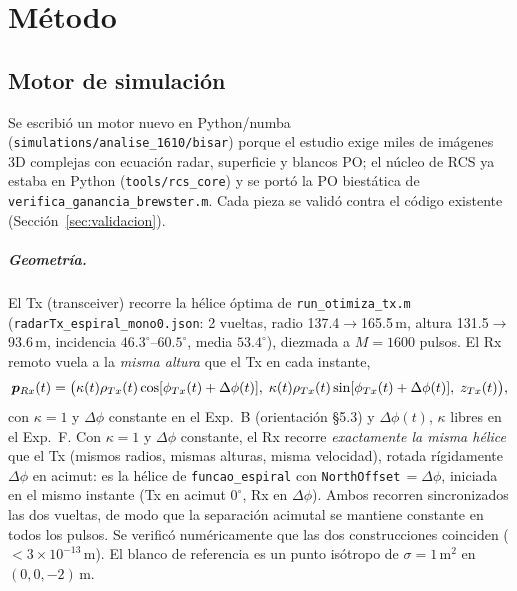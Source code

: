 \chapter{Método}
\label{cap:metodo}

\section{Motor de simulación}

Se escribió un motor nuevo en Python/numba (\texttt{simulations/analise\_1610/bisar})
porque el estudio exige miles de imágenes 3D complejas con ecuación radar,
superficie y blancos PO; el núcleo de RCS ya estaba en Python
(\texttt{tools/rcs\_core}) y se portó la PO biestática de
\texttt{verifica\_ganancia\_brewster.m}. Cada pieza se validó contra el código
existente (Sección~\ref{sec:validacion}).

\paragraph{Geometría.} El Tx (transceiver) recorre la hélice óptima de
\texttt{run\_otimiza\_tx.m} (\texttt{radarTx\_espiral\_mono0.json}: 2 vueltas,
radio 137.4$\to$165.5\,m, altura 131.5$\to$93.6\,m, incidencia
$46.3^{\circ}$--$60.5^{\circ}$, media $53.4^{\circ}$), diezmada a $M=1600$ pulsos. El Rx remoto
vuela a la \emph{misma altura} que el Tx en cada instante,
\begin{equation}
  \bm{p}_{Rx}(t) = \big(\kappa(t)\rho_{Tx}(t)\cos[\phi_{Tx}(t)+\Delta\phi(t)],\;
  \kappa(t)\rho_{Tx}(t)\sin[\phi_{Tx}(t)+\Delta\phi(t)],\; z_{Tx}(t)\big),
\end{equation}
con $\kappa=1$ y $\Delta\phi$ constante en el Exp.~B (orientación §5.3) y
$\Delta\phi(t)$, $\kappa$ libres en el Exp.~F. Con $\kappa=1$ y $\Delta\phi$ constante, el
Rx recorre \emph{exactamente la misma hélice} que el Tx (mismos radios, mismas alturas,
misma velocidad), rotada rígidamente $\Delta\phi$ en acimut: es la hélice de
\texttt{funcao\_espiral} con \texttt{NorthOffset}$\,=\Delta\phi$, iniciada en el mismo instante
(Tx en acimut $0^{\circ}$, Rx en $\Delta\phi$). Ambos recorren sincronizados las dos vueltas, de
modo que la separación acimutal se mantiene constante en todos los pulsos. Se verificó
numéricamente que las dos construcciones coinciden ($<3\times10^{-13}$\,m). El blanco de referencia es un punto
isótropo de $\sigma=1\,\mathrm{m}^2$ en $(0,0,-2)$\,m.

